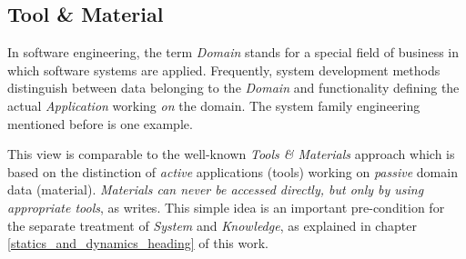 %
%
%
%
%
%
%

\subsection{Tool \& Material}
\label{tool_and_material_heading}

In software engineering, the term \emph{Domain} stands for a special field of
business in which software systems are applied. Frequently, system development
methods distinguish between data belonging to the \emph{Domain} and
functionality defining the actual \emph{Application} working \emph{on} the
domain. The system family engineering mentioned before is one example.

This view is comparable to the well-known \emph{Tools \& Materials} approach
\cite{tandm} which is based on the distinction of \emph{active} applications
(tools) working on \emph{passive} domain data (material). \textit{Materials can
never be accessed directly, but only by using appropriate tools}, as
\cite{tandm} writes. This simple idea is an important pre-condition for the
separate treatment of \emph{System} and \emph{Knowledge}, as explained in
chapter \ref{statics_and_dynamics_heading} of this work.
